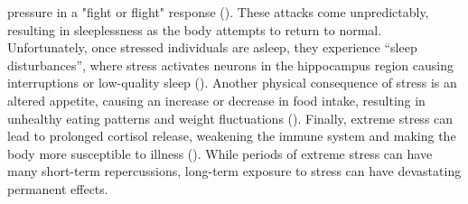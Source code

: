 pressure in a "fight or flight" response (\cite{sha2023}). These attacks come unpredictably, resulting in sleeplessness as the body attempts to return to normal. Unfortunately, once stressed individuals are asleep, they experience “sleep disturbances”, where stress activates neurons in the hippocampus region causing interruptions or low-quality sleep (\cite{mcleod2012}). Another physical consequence of stress is an altered appetite, causing an increase or decrease in food intake, resulting in unhealthy eating patterns and weight fluctuations (\cite{sha2023}). Finally, extreme stress can lead to prolonged cortisol release, weakening the immune system and making the body more susceptible to illness (\cite{cordovaolivera2023}). While periods of extreme stress can have many short-term repercussions, long-term exposure to stress can have devastating permanent effects.

